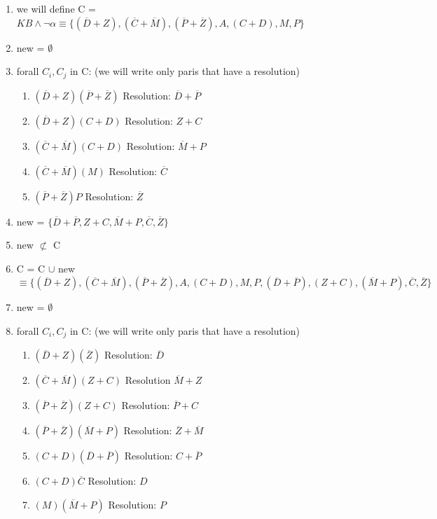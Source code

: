 \documentclass{article}
\begin{document}
\begin{enumerate}
    \item we will define C = $KB \land \neg \alpha \equiv \{(\overline D + Z),(\overline  C + \overline  M),( \overline  P + \overline  Z),A,(C + D),M,P\}$
    \item new = $\emptyset$
    \item forall $C_i, C_j$ in C: (we will write only paris that have a resolution)
    \begin{enumerate}
        \item $(\overline D + Z)(\overline P + \overline Z)$ Resolution: $\overline D + \overline P$
        \item $(\overline D + Z)(C + D)$ Resolution: $Z + C$
        \item $(\overline C + \overline  M)(C+D)$ Resolution: $\overline  M + P$ 
        \item $(\overline C + \overline  M)(M)$ Resolution: $\overline  C$ 
        \item $(\overline P + \overline Z)P$ Resolution: $\overline Z$
    \end{enumerate}
    \item new = $\{\overline D + \overline P, Z + C, \overline M + P, \overline C, \overline Z\}$
    \item new $\not\subset$ C
    \item C = C $\cup$ new $\equiv \{(\overline D + Z),(\overline  C + \overline  M),( \overline  P + \overline  Z),A,(C + D),M,P,(\overline D + \overline P), (Z + C), (\overline M + P), \overline C, \overline Z\}$
    \item new = $\emptyset$
    \item forall $C_i, C_j$ in C: (we will write only paris that have a resolution)
    \begin{enumerate}
        \item $(\overline D + Z)(\overline Z)$ Resolution: $\overline D$
        \item $(\overline C + \overline M)(Z+C)$ Resolution $\overline M + Z$
        \item $(\overline P + \overline Z)(Z+C)$ Resolution: $\overline P + C$
        \item $(\overline P + \overline Z)(\overline M + P)$ Resolution: $\overline Z + \overline M$
        \item $(C+D)(\overline D + \overline P)$ Resolution: $C + \overline P$
        \item $(C+D)\overline C$ Resolution: $D$
        \item $(M)(\overline M + P)$ Resolution: $P$

\end{enumerate}
\end{enumerate}
\end{document}
